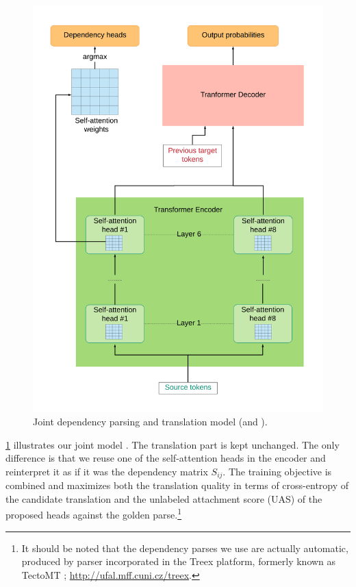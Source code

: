 \begin{figure}[t]
    \includegraphics[width=\textwidth]{img/Joint_Translation_DepParse}
    \caption{Joint dependency parsing and translation model (\DepParse and \DiagonalParse).}
    \label{fig:joint_trans_depparse}
\end{figure}

\cref{fig:joint_trans_depparse} illustrates our joint model \DepParse. The translation
part is kept unchanged. The only difference is that we reuse one of the
self-attention heads in the \transformer encoder and reinterpret it as if it was
the dependency matrix $S_{ij}$.
The training objective is combined and
maximizes both the translation quality in terms of cross-entropy of the
candidate translation and the unlabeled attachment score (UAS) of the proposed
heads against the golden parse.\footnote{It should be noted that the dependency
parses we use are actually automatic, produced by
 parser incorporated in the Treex
platform, formerly known as TectoMT ;
\url{http://ufal.mff.cuni.cz/treex}.}

